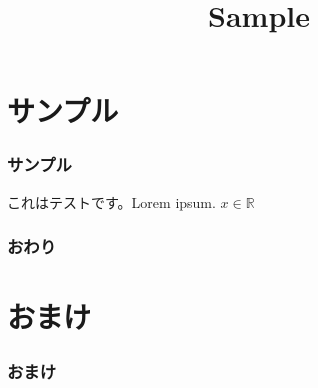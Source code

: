 \documentclass[
  lualatex,
  ja=standard,
  compress,
  hyperref={colorlinks, urlcolor=magenta, linkcolor=blue!55!black},
  dvipsnames,
  svgnames,
]{beamer}
\title{Sample}
\begin{document}
\section{サンプル}
\begin{frame}
  \maketitle
\end{frame}

\begin{frame}
  \frametitle{サンプル}

  これはテストです。Lorem ipsum. $x\in\mathbb{R}$
\end{frame}

\begin{frame}
  \frametitle{おわり}
  \Thankyou
\end{frame}

\appendix
\section{おまけ}
\begin{frame}
  \frametitle{おまけ}
\end{frame}
\end{document}
